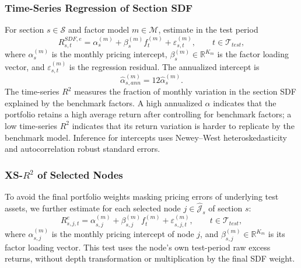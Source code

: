 \documentclass[12pt]{article}
\def\bm#1{#1}%
\def\mathrm#1{#1}%
\def\top{}%
\begin{document}
\subsubsection{Time-Series Regression of Section SDF}

For section \(s\in\mathcal S\) and factor model \(m\in\mathcal M\), estimate in the test period
\begin{equation}
  R_{s,t}^{\mathrm{SDF},e}
  =
  \alpha_s^{(m)}
  +\bm\beta_s^{(m)\top}\bm f_t^{(m)}
  +\varepsilon_{s,t}^{(m)},
  \qquad
  t\in\mathcal T_{\mathrm{test}},
  \label{eq:sdf_factor_regression}
\end{equation}
where \(\alpha_s^{(m)}\) is the monthly pricing intercept, \(\bm\beta_s^{(m)}\in\mathbb R^{K_m}\) is the factor loading vector, and \(\varepsilon_{s,t}^{(m)}\) is the regression residual. The annualized intercept is
\begin{equation}
  \widehat\alpha_{s,\mathrm{ann}}^{(m)}
  =
  12\widehat\alpha_s^{(m)}.
  \label{eq:annual_alpha}
\end{equation}
The time-series \(R^2\) measures the fraction of monthly variation in the section SDF explained by the benchmark factors. A high annualized \(\alpha\) indicates that the portfolio retains a high average return after controlling for benchmark factors; a low time-series \(R^2\) indicates that its return variation is harder to replicate by the benchmark model. Inference for intercepts uses Newey--West heteroskedasticity and autocorrelation robust standard errors.

\subsubsection{XS-\(R^2\) of Selected Nodes}

To avoid the final portfolio weights masking pricing errors of underlying test assets, we further estimate for each selected node \(j\in\widehat{\mathcal J}_s\) of section \(s\):
\begin{equation}
  R_{s,j,t}^{e}
  =
  \alpha_{s,j}^{(m)}
  +\bm\beta_{s,j}^{(m)\top}\bm f_t^{(m)}
  +\varepsilon_{s,j,t}^{(m)},
  \qquad
  t\in\mathcal T_{\mathrm{test}},
  \label{eq:node_factor_regression}
\end{equation}
where \(\alpha_{s,j}^{(m)}\) is the monthly pricing intercept of node \(j\), and \(\bm\beta_{s,j}^{(m)}\in\mathbb R^{K_m}\) is its factor loading vector. This test uses the node's own test-period raw excess returns, without depth transformation or multiplication by the final SDF weight.
\end{document}
